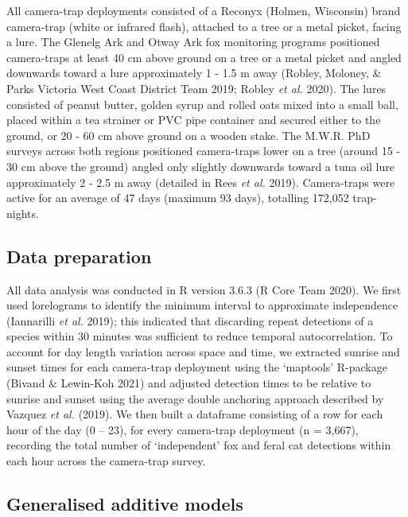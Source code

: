 \documentclass[11pt,a4paper,titlepage,twoside,openright]{style/unimelbthesis}
\begin{document}
\begin{mainmatter}
All camera-trap deployments consisted of a Reconyx (Holmen, Wisconsin) brand camera-trap (white or infrared flash), attached to a tree or a metal picket, facing a lure. The Glenelg Ark and Otway Ark fox monitoring programs positioned camera-traps at least 40 cm above ground on a tree or a metal picket and angled downwards toward a lure approximately 1 - 1.5 m away (Robley, Moloney, \& Parks Victoria West Coast District Team 2019; Robley \emph{et al.} 2020). The lures consisted of peanut butter, golden syrup and rolled oats mixed into a small ball, placed within a tea strainer or PVC pipe container and secured either to the ground, or 20 - 60 cm above ground on a wooden stake. The M.W.R. PhD surveys across both regions positioned camera-traps lower on a tree (around 15 - 30 cm above the ground) angled only slightly downwards toward a tuna oil lure approximately 2 - 2.5 m away (detailed in Rees \emph{et al.} 2019). Camera-traps were active for an average of 47 days (maximum 93 days), totalling 172,052 trap-nights.

\hypertarget{data-preparation}{%
\subsection{Data preparation}\label{data-preparation}}

All data analysis was conducted in R version 3.6.3 (R Core Team 2020). We first used lorelograms to identify the minimum interval to approximate independence (Iannarilli \emph{et al.} 2019); this indicated that discarding repeat detections of a species within 30 minutes was sufficient to reduce temporal autocorrelation. To account for day length variation across space and time, we extracted sunrise and sunset times for each camera-trap deployment using the `maptools' R-package (Bivand \& Lewin-Koh 2021) and adjusted detection times to be relative to sunrise and sunset using the average double anchoring approach described by Vazquez \emph{et al.} (2019). We then built a dataframe consisting of a row for each hour of the day (0 -- 23), for every camera-trap deployment (n = 3,667), recording the total number of `independent' fox and feral cat detections within each hour across the camera-trap survey.

\hypertarget{generalised-additive-models-5}{%
\subsection{Generalised additive models}\label{generalised-additive-models-5}}


\end{mainmatter}
\end{document}
